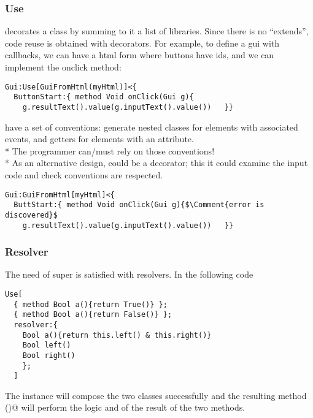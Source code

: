 \begin{frame}[fragile]
\frametitle{Use}
 \Q@Use@ decorates a class by summing to it a list of libraries.
Since there is no ``extends'', code reuse is obtained with decorators.
For example, to define a gui with callbacks, we can have a html form where buttons have ids, and we can implement the onclick method:

\begin{NiceCode}{59ex}{0.8}
\begin{lstlisting}
Gui:Use[GuiFromHtml(myHtml)]<{
  ButtonStart:{ method Void onClick(Gui g){
    g.resultText().value(g.inputText().value())   }}
\end{lstlisting}
\end{NiceCode}

\Q@GuiFromHtml@ have a set of conventions: generate nested classes for elements with associated events, and getters for elements with an \Q@id@ attribute.\\*
The programmer can/must rely on those conventions!\\*
As an alternative design, \Q@GuiFromHtml@ could be a decorator; this it could examine the input code and check conventions are respected.
\begin{NiceCode}{59ex}{0.8}
\begin{lstlisting}
Gui:GuiFromHtml[myHtml]<{
  ButtStart:{ method Void onClick(Gui g){$\Comment{error is discovered}$
    g.resultText().value(g.inputText().value())   }}
\end{lstlisting}
\end{NiceCode}
\end{frame}


\begin{frame}[fragile]
\frametitle{Resolver}
The need of super is satisfied with resolvers. In the following code
\begin{NiceCode}{59ex}{0.8}
\begin{lstlisting}
Use[
  { method Bool a(){return True()} };
  { method Bool a(){return False()} };
  resolver:{
    Bool a(){return this.left() & this.right()}
    Bool left()
    Bool right()  
    };
  ]
\end{lstlisting}
\end{NiceCode}
The \Q@Use@ instance will compose the two classes successfully and
the resulting method \Q@a()@ will perform the logic and of the result of the two methods.

\end{frame}


